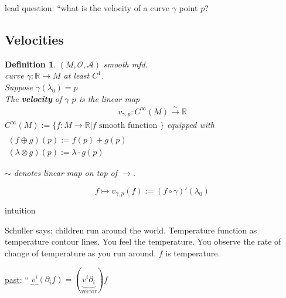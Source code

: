 \documentclass[10pt]{amsart}
\newtheorem{definition}{Definition}
\begin{document}
\begin{multicols*}{2}
	lead question: ``what is the velocity of a curve $\gamma$ \@ point $p$?
	
	\subsection{Velocities}
	
	\begin{definition}
		$(M,\mathcal{O},\mathcal{A})$ smooth mfd. \\
		curve $\gamma : \mathbb{R} \to M$ at least $C^1$.   \\
		Suppose $\gamma(\lambda_0) =p$ \\
		The \textbf{velocity} of $\gamma$ \@ $p$ is the linear map 
		\[
		\begin{gathered}
		v_{\gamma, p} : C^{\infty}(M) \xrightarrow{ \sim } \mathbb{R}
		\end{gathered}
		\]
		$C^{\infty}(M) := \lbrace f: M \to \mathbb{R} | f \text{ smooth function } \rbrace$ equipped with $\begin{gathered}  \quad \\ 
		(f\oplus g)(p) := f(p) + g(p) \\
		(\lambda \otimes g)(p) := \lambda \cdot g(p) \end{gathered}$
		
		$\sim$ denotes linear map on top of $\xrightarrow{}$.
		
		\[
		f \mapsto v_{\gamma,p}(f):= (f\circ \gamma)'(\lambda_0)
		\]
		
		
	\end{definition}
	
	intuition
	
	
	
	Schuller says: children run around the world.  Temperature function as temperature contour lines.  You feel the temperature.  You observe the rate of change of temperature as you run around.  $f$ is temperature.  
	
	\underline{past}: `` $\underbrace{v^i}_{} (\partial_i f) = (\underbrace{v^i \partial_i}_{\text{vector}})f$ 
	

\end{multicols*}
\end{document}
